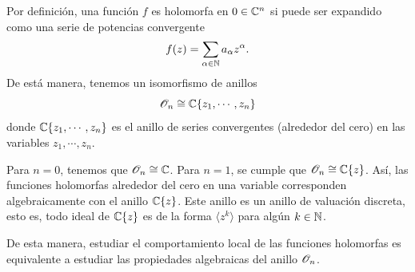 \begin{remark}
	Por definición, una función $f$ es holomorfa en $0\in\mathbb{C}^n$ si puede ser expandido como una serie de potencias convergente 
	\begin{equation*}
		f(z)=\sum_{\alpha\in\mathbb{N}}a_\alpha z^\alpha.
	\end{equation*}
	De está manera, tenemos un isomorfismo de anillos 
	\begin{equation*}
		\mathscr{O}_{n}\cong \mathbb{C}\{z_1,\cdots,z_n\}
	\end{equation*}
	donde $\mathbb{C}\{z_1,\cdots,z_n\}$ es el anillo de series convergentes (alrededor del cero) en las variables $z_1,\cdots,z_n$.
\end{remark}

\begin{example}
	Para $n=0$, tenemos que $\mathscr{O}_{n}\cong\mathbb{C}$. Para $n=1$, se cumple que $\mathscr{O}_{n}\cong\mathbb{C}\{z\}$. Así, las funciones holomorfas alrededor del cero en una variable corresponden algebraicamente con el anillo $\mathbb{C}\{z\}$. Este anillo es un anillo de valuación discreta, esto es, todo ideal de $\mathbb{C}\{z\}$ es de la forma $\langle z^k \rangle$ para algún $k\in\mathbb{N}$.
\end{example}

De esta manera, estudiar el comportamiento local de las funciones holomorfas es equivalente a estudiar las propiedades algebraicas del anillo $\mathscr{O}_{n}$.

